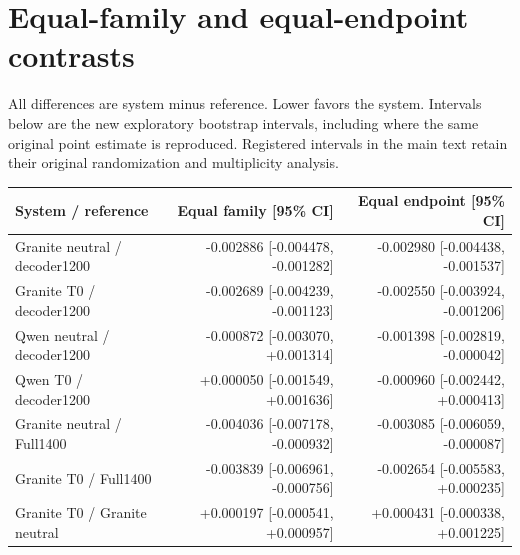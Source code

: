 \documentclass[10pt]{article}
\begin{document}
\section{Equal-family and equal-endpoint contrasts}
All differences are system minus reference. Lower favors the system. Intervals below are the new exploratory bootstrap intervals, including where the same original point estimate is reproduced. Registered intervals in the main text retain their original randomization and multiplicity analysis.
\begin{longtable}{@{}p{}rr@{}}\toprule
System / reference & Equal family [95\% CI] & Equal endpoint [95\% CI]\\\midrule
Granite neutral / decoder1200 & -0.002886 [-0.004478, -0.001282] & -0.002980 [-0.004438, -0.001537]\\
Granite T0 / decoder1200 & -0.002689 [-0.004239, -0.001123] & -0.002550 [-0.003924, -0.001206]\\
Qwen neutral / decoder1200 & -0.000872 [-0.003070, +0.001314] & -0.001398 [-0.002819, -0.000042]\\
Qwen T0 / decoder1200 & +0.000050 [-0.001549, +0.001636] & -0.000960 [-0.002442, +0.000413]\\
Granite neutral / Full1400 & -0.004036 [-0.007178, -0.000932] & -0.003085 [-0.006059, -0.000087]\\
Granite T0 / Full1400 & -0.003839 [-0.006961, -0.000756] & -0.002654 [-0.005583, +0.000235]\\
Granite T0 / Granite neutral & +0.000197 [-0.000541, +0.000957] & +0.000431 [-0.000338, +0.001225]\\
\bottomrule\end{longtable}
\end{document}
